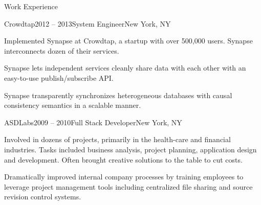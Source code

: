 \documentclass{resume} %
\begin{document}
\begin{rSection}{Work Experience}


\begin{rSubsection}{Crowdtap}{2012 -- 2013}{System Engineer}{New York, NY}
\item Implemented Synapse at Crowdtap, a startup with over 500,000 users. Synapse interconnects dozen of their services.
\item Synapse lets independent services cleanly share data with each other with 
an easy-to-use publish/subscribe API.
\item Synapse transparently synchronizes heterogeneous databases with causal consistency semantics in a scalable manner.
\end{rSubsection}



\begin{rSubsection}{ASDLabs}{2009 -- 2010}{Full Stack Developer}{New York, NY}
\item Involved in dozens of projects, primarily in the health-care and financial
      industries. Tasks included business analysis, project planning, application
      design and development. Often brought creative solutions to the table to cut costs.
\item Dramatically improved internal company processes by training employees to
      leverage project management tools including centralized file sharing and source revision control systems.
\end{rSubsection}


\end{rSection}
\end{document}
